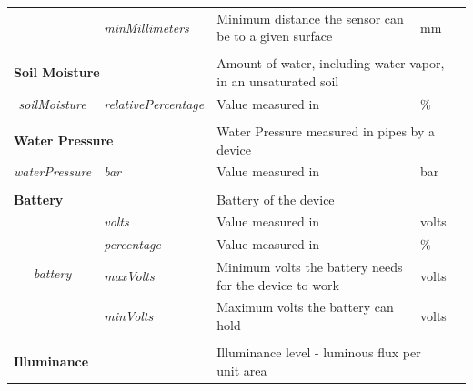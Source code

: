 \begin{landscape}
\begin{longtable}{cllll}
                                         & \textit{minMillimeters}            & Minimum distance the sensor can be to a given surface  & mm                             &  \\ [0.4em] \cline{1-4}
   \\[-0.85em]
   \multicolumn{2}{l}{\textbf{Soil Moisture}}                                 & \multicolumn{2}{l}{Amount of water, including water vapor, in an unsaturated soil}      &  \\
   \textit{soilMoisture}                  & \textit{relativePercentage}        & Value measured in                                      & \%                             &  \\ [0.4em] \cline{1-4}
   \\[-0.85em]
   \multicolumn{2}{l}{\textbf{Water Pressure}}                                & \multicolumn{2}{l}{Water Pressure measured in pipes by a device}                        &  \\
   \textit{waterPressure}                & \textit{bar}                       & Value measured in                                      & bar                            &  \\ [0.4em] \cline{1-4}
   \\[-0.85em]
   \multicolumn{2}{l}{\textbf{Battery}}                                       & \multicolumn{2}{l}{Battery of the device}                                               &  \\
   \multirow{4}{*}{\textit{battery}}     & \textit{volts}                     & Value measured in                                      & volts                          &  \\
                                         & \textit{percentage}                & Value measured in                                      & \%                             &  \\
                                         & \textit{maxVolts}                  & Minimum volts the battery needs for the device to work & volts                          &  \\
                                         & \textit{minVolts}                  & Maximum volts the battery can hold                     & volts                          &  \\ [0.4em] \cline{1-4}
   \\[-0.85em]
   \multicolumn{2}{l}{\textbf{Illuminance}}                                   & \multicolumn{2}{l}{Illuminance level - luminous flux per unit area}                     &  \\

\end{longtable}
\end{landscape}
